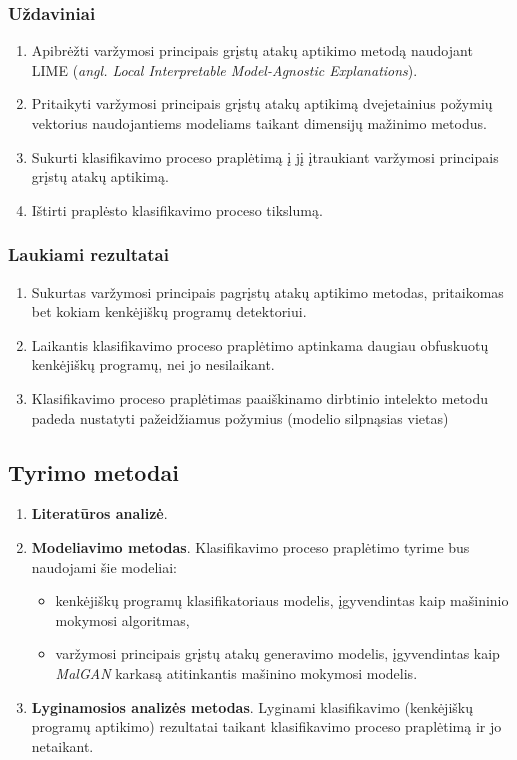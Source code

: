 \subsubsection{Uždaviniai}
\begin{enumerate}
    \item Apibrėžti varžymosi principais grįstų atakų aptikimo metodą naudojant LIME (\textit{angl. Local Interpretable Model-Agnostic Explanations}).
    \item Pritaikyti varžymosi principais grįstų atakų aptikimą dvejetainius požymių vektorius naudojantiems modeliams taikant dimensijų mažinimo metodus.
    \item Sukurti klasifikavimo proceso praplėtimą į jį įtraukiant varžymosi principais
          grįstų atakų aptikimą.
    \item Ištirti praplėsto klasifikavimo proceso tikslumą.
\end{enumerate}

\subsubsection{Laukiami rezultatai}
\begin{enumerate}
    \item Sukurtas varžymosi principais pagrįstų atakų aptikimo metodas, pritaikomas bet kokiam kenkėjiškų programų detektoriui.
    \item Laikantis klasifikavimo proceso praplėtimo aptinkama daugiau obfuskuotų kenkėjiškų programų, nei jo nesilaikant.
    \item Klasifikavimo proceso praplėtimas paaiškinamo dirbtinio intelekto metodu padeda nustatyti pažeidžiamus požymius (modelio silpnąsias vietas)
\end{enumerate}

\subsection{Tyrimo metodai}

\begin{enumerate}
    \item \textbf{Literatūros analizė}.
    \item \textbf{Modeliavimo metodas}. Klasifikavimo proceso praplėtimo tyrime bus naudojami šie modeliai:
    \begin{itemize}
        \item kenkėjiškų programų klasifikatoriaus modelis, įgyvendintas kaip mašininio mokymosi algoritmas,
        \item varžymosi principais grįstų atakų generavimo modelis, įgyvendintas kaip \textit{MalGAN} karkasą atitinkantis mašinino mokymosi modelis.
    \end{itemize}
    \item \textbf{Lyginamosios analizės metodas}. Lyginami klasifikavimo (kenkėjiškų programų aptikimo) rezultatai taikant klasifikavimo proceso praplėtimą ir jo netaikant.
\end{enumerate}

